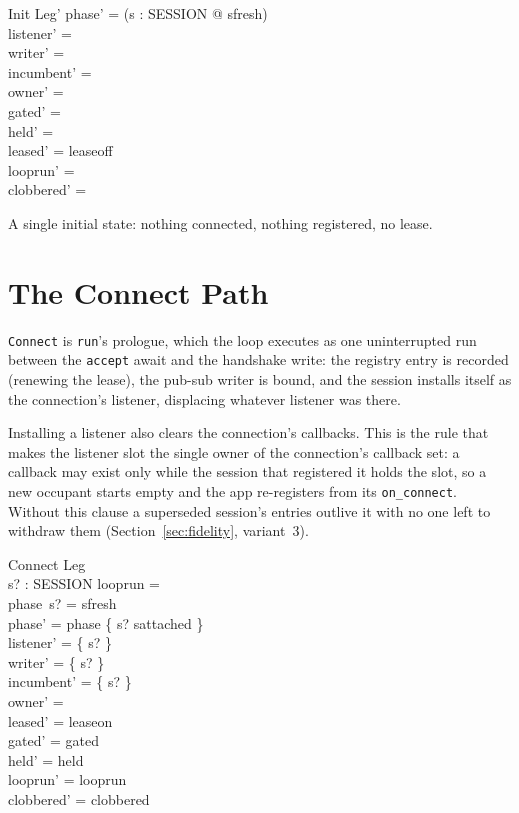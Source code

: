 \documentclass[a4paper,10pt,fleqn]{article}
\begin{document}
\begin{schema}{Init}
  Leg'
\where
  phase' = (\lambda s : SESSION @ sfresh) \\
  listener' = \emptyset \\
  writer' = \emptyset \\
  incumbent' = \emptyset \\
  owner' = \emptyset \\
  gated' = \emptyset \\
  held' = \emptyset \\
  leased' = leaseoff \\
  looprun' = \emptyset \\
  clobbered' = \emptyset
\end{schema}

A single initial state: nothing connected, nothing registered, no lease.

\section{The Connect Path}

\texttt{Connect} is \texttt{run}'s prologue, which the loop executes as
one uninterrupted run between the \texttt{accept} await and the
handshake write: the registry entry is recorded (renewing the lease),
the pub-sub writer is bound, and the session installs itself as the
connection's listener, displacing whatever listener was there.

Installing a listener also clears the connection's callbacks.  This is
the rule that makes the listener slot the single owner of the
connection's callback set: a callback may exist only while the session
that registered it holds the slot, so a new occupant starts empty and
the app re-registers from its \texttt{on\_connect}.  Without this
clause a superseded session's entries outlive it with no one left to
withdraw them (Section~\ref{sec:fidelity}, variant~3).

\begin{schema}{Connect}
  \Delta Leg \\
  s? : SESSION
\where
  looprun = \emptyset \\
  phase~s? = sfresh \\
  phase' = phase \oplus \{ s? \mapsto sattached \} \\
  listener' = \{ s? \} \\
  writer' = \{ s? \} \\
  incumbent' = \{ s? \} \\
  owner' = \emptyset \\
  leased' = leaseon \\
  gated' = gated \\
  held' = held \\
  looprun' = looprun \\
  clobbered' = clobbered
\end{schema}
\end{document}
